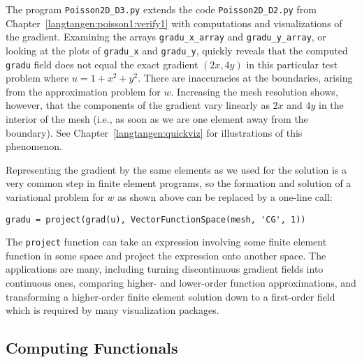 The program {\fontsize{12pt}{12pt}\verb!Poisson2D_D3.py!} extends the
code {\fontsize{12pt}{12pt}\verb!Poisson2D_D2.py!} from Chapter~\ref{langtangen:poisson1:verify1}
with computations and visualizations of the gradient.
Examining the arrays {\fontsize{12pt}{12pt}\verb!gradu_x_array!}
and {\fontsize{12pt}{12pt}\verb!gradu_y_array!}, or looking at the plots of
{\fontsize{12pt}{12pt}\verb!gradu_x!} and 
{\fontsize{12pt}{12pt}\verb!gradu_y!}, quickly reveals that
the computed {\fontsize{12pt}{12pt}\texttt{gradu}} field does not equal the exact
gradient $(2x, 4y)$ in this particular test problem where $u=1+x^2+y^2$. 
There are inaccuracies at the boundaries, arising from the
approximation problem for $w$. Increasing the mesh resolution shows,
however, that the components of the gradient vary linearly as
$2x$ and $4y$ in
the interior of the mesh (i.e., as soon as we are one element away from
the boundary). See Chapter~\ref{langtangen:quickviz} for illustrations of
this phenomenon.

Representing the gradient by the same elements as we used for the
solution is a very common step in finite element programs, so the
formation and solution of a variational problem for $w$ as shown above
can be replaced by a one-line call:
\begin{Verbatim}[fontsize=\fontsize{10pt}{10pt},tabsize=8,baselinestretch=1.05,
fontfamily=tt,xleftmargin=7mm]
gradu = project(grad(u), VectorFunctionSpace(mesh, 'CG', 1))
\end{Verbatim}
\noindent
The {\fontsize{12pt}{12pt}\texttt{project}} function can take an expression involving some
finite element function in some space and project the expression onto
another space.
The applications are many, including turning discontinuous gradient
fields into continuous ones, comparing higher- and lower-order
function approximations, and transforming a higher-order finite element
solution down to a first-order field which is required by many
visualization packages.

\subsection{Computing Functionals}
\label{langtangen:poisson1:functionals}

